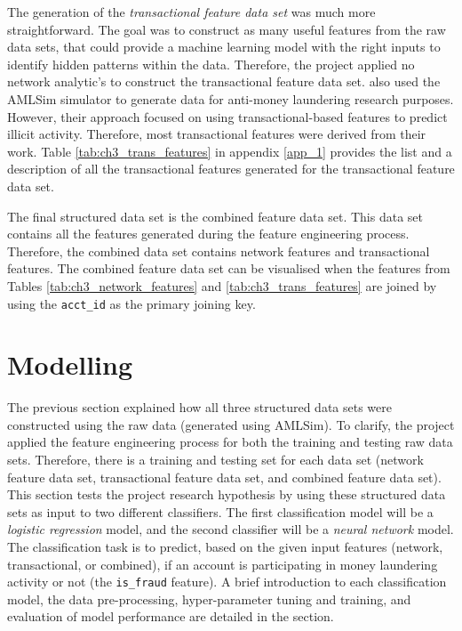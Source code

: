 The generation of the \textit{transactional feature data set} was much more straightforward. The goal was to construct as many useful features from the raw data sets, that could provide a machine learning model with the right inputs to identify hidden patterns within the data. Therefore, the project applied no network analytic's to construct the transactional feature data set. \citet{visserdetection} also used the AMLSim simulator to generate data for anti-money laundering research purposes. However, their approach focused on using transactional-based features to predict illicit activity. Therefore, most  transactional features were derived from their work. Table \ref{tab:ch3_trans_features} in appendix \ref{app_1} provides the list and a description of all the transactional features generated for the transactional feature data set.      

The final structured data set is the combined feature data set. This data set contains all the features generated during the feature engineering process. Therefore, the combined data set contains network features and transactional features. The combined feature data set can be visualised when the features from Tables \ref{tab:ch3_network_features} and \ref{tab:ch3_trans_features} are joined by using the \texttt{acct\_id} as the primary joining key.  

\section{Modelling} \label{ch3_sub_heading_modelling}

The previous section explained how all three structured data sets were constructed using the raw data (generated using AMLSim). To clarify, the project applied the feature engineering process for both the training and testing raw data sets. Therefore, there is a training and testing set for each data set (network feature data set, transactional feature data set, and combined feature data set). This section tests the project research hypothesis by using these structured data sets as input to two different classifiers. The first classification model will be a \textit{logistic regression} model, and the second classifier will be a \textit{neural network} model. The classification task is to predict, based on the given input features (network, transactional, or combined), if an account is participating in money laundering activity or not (the \texttt{is\_fraud} feature). A brief introduction to each classification model, the data pre-processing, hyper-parameter tuning and training, and evaluation of model performance are detailed in the section.               

